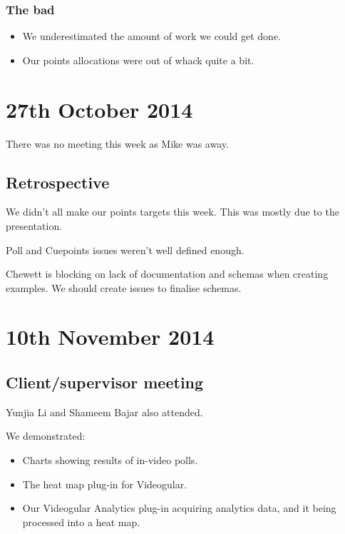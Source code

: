 \subsubsection{The bad}

\begin{itemize}
\itemsep1pt\parskip0pt
\item
  We underestimated the amount of work we could get done.
\item
  Our points allocations were out of whack quite a bit.
\end{itemize}

\section{27th October 2014}\label{Minutes:2014-10-27}

There was no meeting this week as Mike was away.

\subsection{Retrospective}

We didn't all make our points targets this week. This was mostly due to
the presentation.

Poll and Cuepoints issues weren't well defined enough.

Chewett is blocking on lack of documentation and schemas when creating
examples. We should create issues to finalise schemas.

\section{10th November 2014}\label{Minutes:2014-11-10}

\subsection{Client/supervisor meeting}

Yunjia Li and Shameem Bajar also attended.

We demonstrated:

\begin{itemize}
\itemsep1pt\parskip0pt
\item
  Charts showing results of in-video polls.
\item
  The heat map plug-in for Videogular.
\item
  Our Videogular Analytics plug-in acquiring analytics data, and it
  being processed into a heat map.
\end{itemize}

